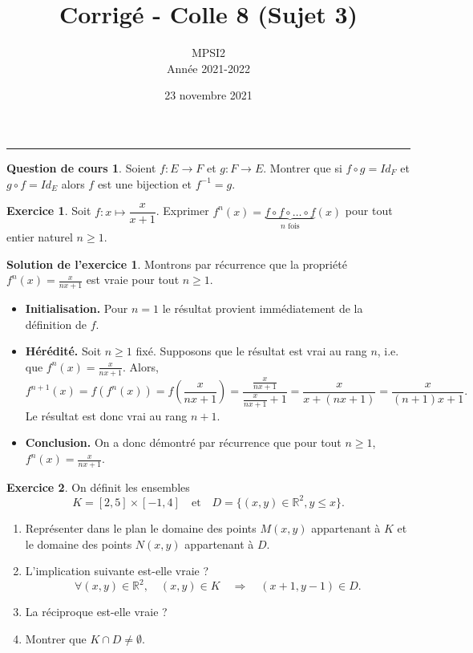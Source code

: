 \documentclass[a4paper, 11pt,openany]{article}%
\title{Corrigé - Colle 8 (Sujet 3)}
\author{MPSI2\\
Année 2021-2022}
\date{23 novembre 2021}
\theoremstyle{plain}
\theoremstyle{definition}
\newtheorem{cours}{Question de cours}
\newtheorem{exo}{Exercice}
\newtheorem{sol}{Solution de l'exercice}
\theoremstyle{remark}
\newcommand{\R}{\mathbb{R}}
\begin{document}
   \maketitle
      \rule{\linewidth}{0.5mm}

\begin{cours}
Soient $f : E \to F$ et $g : F \to E$. Montrer que si $f \circ g = Id_F$ et $g \circ f = Id_E$ alors $f$ est une bijection et $f^{-1} = g$.
\end{cours}


\begin{exo}
Soit $f\colon x \mapsto \dfrac{x}{x+1}$. Exprimer $f^n(x) = \underbrace{f\circ f \circ \ldots \circ f}_{n\text{ fois}}(x)$ pour tout entier naturel $n \geqslant 1$.
\end{exo}

\begin{sol}
Montrons par récurrence que la propriété $f^n(x) = \frac{x}{nx+1}$ est vraie pour tout $n \geqslant 1$.
\begin{itemize}
\item \textbf{Initialisation.} Pour $n=1$ le résultat provient immédiatement de la définition de $f$.
\item \textbf{Hérédité.} Soit $n \geqslant 1$ fixé. Supposons que le résultat est vrai au rang $n$, i.e. que $f^n(x) = \frac{x}{nx+1}$. Alors,
\[ f^{n+1}(x) = f(f^n(x)) = f \left( \frac{x}{nx+1} \right) = \frac{\frac{x}{nx+1}}{\frac{x}{nx+1} +1 } = \frac{x}{x+(nx+1)} = \frac{x}{(n+1)x+1}.\]
Le résultat est donc vrai au rang $n+1$.
\item \textbf{Conclusion.} On a donc démontré par récurrence que pour tout $n \geqslant 1$, $f^n(x) = \frac{x}{nx+1}$.
\end{itemize}
\end{sol}


\begin{exo}
On définit les ensembles
\[ K = [2,5] \times [-1,4] \quad \text{et} \quad D = \{(x,y) \in \R^2, y \leqslant x \}.\]
\begin{enumerate}
\item Représenter dans le plan le domaine des points $M(x,y)$ appartenant à $K$ et le domaine des points $N(x,y)$ appartenant à $D$.
\item L'implication suivante est-elle vraie ?
\[ \forall (x,y) \in \R^2, \quad (x,y) \in K \quad \Rightarrow \quad (x + 1,y - 1)\in D.\]
\item La réciproque est-elle vraie ?
\item Montrer que $K \cap D \neq \emptyset$.
\end{enumerate}
\end{exo}
\end{document}
